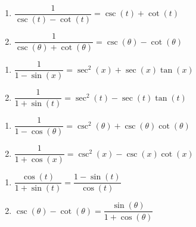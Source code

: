 \documentclass{ximera}
\begin{document}
\begin{multicols}{2}

\begin{enumerate}

\setcounter{enumi}{\value{HW}}

\item  $\dfrac{1}{\csc(t) - \cot(t)} = \csc(t) + \cot(t)$
\item  $\dfrac{1}{\csc(\theta) + \cot(\theta)} = \csc(\theta) - \cot(\theta)$

\setcounter{HW}{\value{enumi}}

\end{enumerate}

\end{multicols}

\begin{multicols}{2}

\begin{enumerate}

\setcounter{enumi}{\value{HW}}

\item  $\dfrac{1}{1-\sin(x)} = \sec^{2}(x) + \sec(x) \tan(x)$
\item  $\dfrac{1}{1+\sin(t)} = \sec^{2}(t) - \sec(t) \tan(t)$

\setcounter{HW}{\value{enumi}}

\end{enumerate}

\end{multicols}

\begin{multicols}{2}

\begin{enumerate}

\setcounter{enumi}{\value{HW}}

\item  $\dfrac{1}{1-\cos(\theta)} = \csc^{2}(\theta) + \csc(\theta) \cot(\theta)$
\item  $\dfrac{1}{1+\cos(x)} = \csc^{2}(x) - \csc(x) \cot(x)$

\setcounter{HW}{\value{enumi}}

\end{enumerate}

\end{multicols}

\begin{multicols}{2}

\begin{enumerate}

\setcounter{enumi}{\value{HW}}

\item $\dfrac{\cos(t)}{1 + \sin(t)} = \dfrac{1-\sin(t)}{\cos(t)}$
\item $\csc(\theta) - \cot(\theta) = \dfrac{\sin(\theta)}{1 + \cos(\theta)}$

\setcounter{HW}{\value{enumi}}

\end{enumerate}

\end{multicols}
\end{document}
